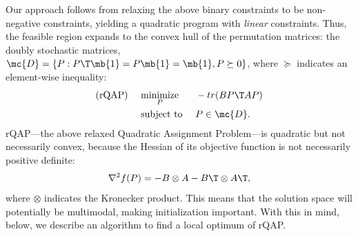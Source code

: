 \documentclass[10pt,journal,cspaper,compsoc]{IEEEtran}
\begin{document}
Our approach follows from relaxing the above binary constraints
to be non-negative constraints, yielding a quadratic program with \emph{linear} constraints.  %
Thus, the feasible region expands to the convex hull of the permutation matrices: the doubly stochastic matrices, $\mc{D}=\{P : P\T \mb{1} =  P \mb{1} = \mb{1}, P \succeq 0\}$, where $\succeq$ indicates an element-wise inequality:
\begin{subequations} \label{eq:FAQ}
\begin{align}
		\text{(rQAP) } \quad &\underset{P}{\text{minimize}}  && - tr(B P\T AP) \label{eq:FAQ1}  \\
		&\text{subject to } && P \in \mc{D}.
\end{align}
\end{subequations}
% 
rQAP---the above relaxed Quadratic Assignment Problem---is quadratic but not necessarily convex, 
because the Hessian of its objective function is not necessarily positive definite:
\begin{align}
	\nabla^2 f(P)  =  - B \otimes A - B\T \otimes A\T,
\end{align}
where $\otimes$ indicates the Kronecker product. This means that the solution space will potentially be multimodal, making initialization important.  With this in mind, below, we describe an algorithm to find a local optimum of rQAP.
\end{document}
